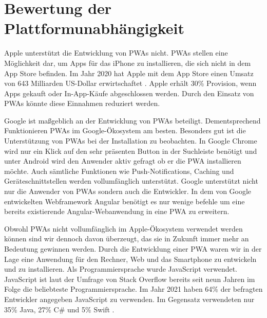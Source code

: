 \chapter{Bewertung der Plattformunabhängigkeit}

Apple unterstützt die Entwicklung von PWAs nicht. PWAs stellen  eine Möglichkeit dar, um Apps für das iPhone zu installieren, die sich nicht in dem App Store befinden. Im Jahr 2020 hat Apple mit dem App Store einen Umsatz von 643 Milliarden US-Dollar erwirtschaftet \cite{Kirchenbauer2021}. Apple erhält 30\% Provision, wenn Apps gekauft oder In-App-Käufe abgeschlossen werden. Durch den Einsatz von PWAs könnte diese Einnahmen reduziert werden.

Google ist maßgeblich an der Entwicklung von PWAs beteiligt. Dementsprechend Funktionieren PWAs im Google-Ökosystem am besten. Besonders gut ist die Unterstützung von PWAs bei der Installation zu beobachten. In Google Chrome wird nur ein Klick auf den sehr präsenten Button in der Suchleiste benötigt und unter Android wird den Anwender aktiv gefragt ob er die PWA installieren möchte. Auch sämtliche Funktionen wie Push-Notifications, Caching und Geräteschnittstellen werden vollumfänglich unterstützt. 
Google unterstützt nicht nur die Anwender von PWAs sondern auch die Entwickler. In dem von Google entwickelten Webframework Angular benötigt es nur wenige befehle um eine bereits existierende Angular-Webanwendung in eine PWA zu erweitern. 

Obwohl PWAs nicht vollumfänglich im Apple-Ökosystem verwendet werden können sind wir dennoch davon überzeugt, das sie in Zukunft immer mehr an Bedeutung gewinnen werden. Durch die Entwicklung einer PWA waren wir in der Lage eine Anwendung für den Rechner, Web und das Smartphone zu entwickeln und zu installieren. Als Programmiersprache wurde JavaScript verwendet. JavaScript ist laut der Umfrage von Stack Overflow bereits seit neun Jahren im Folge die beliebteste Programmiersprache. Im Jahr 2021 haben 64\% der befragten Entwickler angegeben JavaScript zu verwenden.
Im Gegensatz verwendeten nur 35\% Java, 27\% C\# und 5\% Swift \cite{stackoverflow2021}. 


